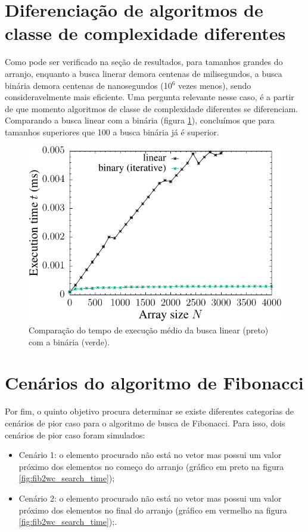 \section{Diferenciação de algoritmos de classe de complexidade diferentes}

Como pode ser verificado na seção de resultados, para tamanhos grandes do arranjo, enquanto a busca linerar demora centenas de milisegundos, a busca binária demora centenas de nanosegundos (10$^6$ vezes menos), sendo consideravelmente mais eficiente. Uma pergunta relevante nesse caso, é a partir de que momento algoritmos de classe de complexidade diferentes se diferenciam. Comparando a busca linear com a binária (figura \ref{fig:lvsb_search_time}), concluímos que para tamanhos superiores que 100 a busca binária já é superior.

\begin{figure}[H]
  \centering
  \includegraphics[scale=1.2]{../plots/lvsb_search_time.pdf}
  \caption{Comparação do tempo de execução médio da busca linear (preto) com a binária (verde).}
  \label{fig:lvsb_search_time}
\end{figure} 

\section{Cenários do algoritmo de Fibonacci}

Por fim, o quinto objetivo procura determinar se existe diferentes categorias de cenários de pior caso para o algoritmo de busca de Fibonacci. Para isso, dois cenários de pior caso foram simulados:
\begin{itemize}
\item Cenário 1: o elemento procurado não está no vetor mas possui um valor próximo dos elementos no começo do arranjo (gráfico em preto na figura \ref{fig:fib2wc_search_time});
\item Cenário 2: o elemento procurado não está no vetor mas possui um valor próximo dos elementos no final do arranjo (gráfico em vermelho na figura \ref{fig:fib2wc_search_time});.
\end{itemize}

